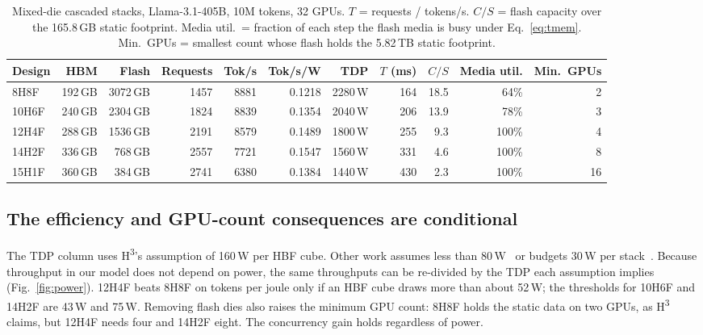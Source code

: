 \documentclass[conference,10pt]{IEEEtran}
\newcommand{\Hthree}{H\textsuperscript{3}}
\begin{document}
\begin{table}[t]
\centering
\caption{Mixed-die cascaded stacks, Llama-3.1-405B, 10M tokens, 32 GPUs. $T$ =
requests / tokens/s. $C/S$ = flash capacity over the 165.8\,GB static
footprint. Media util.\ = fraction of each step the flash media is busy under
Eq.~\eqref{eq:tmem}. Min.\ GPUs = smallest count whose flash holds the 5.82\,TB
static footprint.}
\label{tab:mixed}
\footnotesize
\begin{tabular}{@{}lrrrrrrrrrr@{}}
\toprule
\textbf{Design} & \textbf{HBM} & \textbf{Flash} & \textbf{Requests} & \textbf{Tok/s} &
\textbf{Tok/s/W} & \textbf{TDP} & \textbf{$T$ (ms)} & \textbf{$C/S$} &
\textbf{Media util.} & \textbf{Min.\ GPUs} \\
\midrule
8H8F  & 192\,GB & 3072\,GB & 1457 & 8881 & 0.1218 & 2280\,W & 164 & 18.5 & 64\%  & 2 \\
10H6F & 240\,GB & 2304\,GB & 1824 & 8839 & 0.1354 & 2040\,W & 206 & 13.9 & 78\%  & 3 \\
12H4F & 288\,GB & 1536\,GB & 2191 & 8579 & 0.1489 & 1800\,W & 255 &  9.3 & 100\% & 4 \\
14H2F & 336\,GB &  768\,GB & 2557 & 7721 & 0.1547 & 1560\,W & 331 &  4.6 & 100\% & 8 \\
15H1F & 360\,GB &  384\,GB & 2741 & 6380 & 0.1384 & 1440\,W & 430 &  2.3 & 100\% & 16 \\
\bottomrule
\end{tabular}
\end{table}

\subsection{The efficiency and GPU-count consequences are conditional}
The TDP column uses \Hthree{}'s assumption of 160\,W per HBF cube. Other work
assumes less than 80\,W~\cite{son2026exploring,peng2026grhbf} or budgets 30\,W per
stack~\cite{hsu2026haven}. Because throughput in our model does not depend on
power, the same throughputs can be re-divided by the TDP each assumption implies
(Fig.~\ref{fig:power}). 12H4F beats 8H8F on tokens per joule only if an HBF cube
draws more than about 52\,W; the thresholds for 10H6F and 14H2F are 43\,W and
75\,W. Removing flash dies also raises the minimum GPU count: 8H8F holds the
static data on two GPUs, as \Hthree{} claims, but 12H4F needs four and 14H2F eight.
The concurrency gain holds regardless of power.
\end{document}
